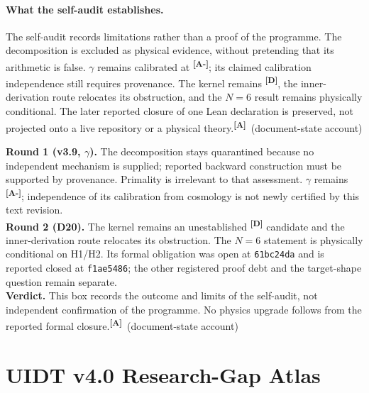 \documentclass[12pt,a4paper,twoside]{article}
\theoremstyle{plain}
\theoremstyle{definition}
\theoremstyle{remark}
\newcommand{\catmark}[1]{\textsuperscript{\textsf{\textbf{[#1]}}}}
\begin{document}
\paragraph{What the self-audit establishes.}
The self-audit records limitations rather than a proof of the programme.
The decomposition is excluded as physical evidence, without pretending that
its arithmetic is false. $\gamma$ remains calibrated at \catmark{A-};
its claimed calibration independence still requires provenance. The kernel
remains \catmark{D}, the inner-derivation route relocates its obstruction,
and the $N=6$ result remains physically conditional. The later reported
closure of one Lean declaration is preserved, not projected onto a live
repository or a physical theory.\catmark{A}\ (document-state account)

\begin{governancebox}
\textbf{Round 1 (v3.9, $\gamma$).} The decomposition stays quarantined
because no independent mechanism is supplied; reported backward construction
must be supported by provenance. Primality is irrelevant to that assessment.
$\gamma$ remains \catmark{A-}; independence of its calibration from cosmology
is not newly certified by this text revision.\\[0.35em]
\textbf{Round 2 (D20).} The kernel remains an unestablished \catmark{D}
candidate and the inner-derivation route relocates its obstruction.
The $N=6$ statement is physically conditional on H1/H2. Its formal obligation
was open at \texttt{61bc24da} and is reported closed at \texttt{f1ae5486};
the other registered proof debt and the target-shape question remain separate.\\[0.35em]
\textbf{Verdict.} This box records the outcome and limits of the self-audit,
not independent confirmation of the programme. No physics upgrade follows
from the reported formal closure.\catmark{A}\ (document-state account)
\end{governancebox}




\newpage
\section{UIDT v4.0 Research-Gap Atlas}
\label{sec:ctx-v4-gap-atlas}
\end{document}
